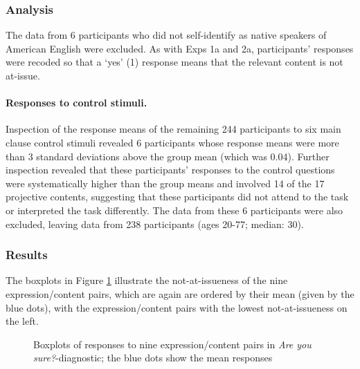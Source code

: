 \documentclass[11pt,fleqn]{article}
\newcommand{\6}{\mbox{$[\hspace*{-.6mm}[$}}
\newcommand{\9}{\mbox{$]\hspace*{-.6mm}]$}}
\begin{document}
\subsubsection{Analysis}

The data from 6 participants who did not self-identify as native speakers of American English were excluded. As with Exps 1a and 2a, participants' responses were recoded so that a `yes' (1) response means that the relevant content is not at-issue.

\paragraph{Responses to control stimuli.} 
Inspection of the response means of the remaining 244 participants to six main clause control stimuli revealed 6 participants whose response means were more than 3 standard deviations above the group mean (which was 0.04). Further inspection revealed that these participants' responses to the control questions were systematically higher than the group means and involved 14 of the 17 projective contents, suggesting that these participants did not attend to the task or interpreted the task differently. The data from these 6 participants were also excluded, leaving data from 238 participants (ages 20-77; median: 30). 

\subsubsection{Results}

The boxplots in Figure \ref{f-exp2a} illustrate the not-at-issueness of the nine expression/content pairs, which are again are ordered by their mean (given by the blue dots), with the expression/content pairs with the lowest not-at-issueness on the left. 

\begin{figure}[!h]

\begin{center}

\end{center}

\caption{Boxplots of responses to nine expression/content pairs in {\em Are you sure?}-diagnostic; the blue dots show the mean responses}\label{f-exp2a}
\end{figure}
\end{document}
